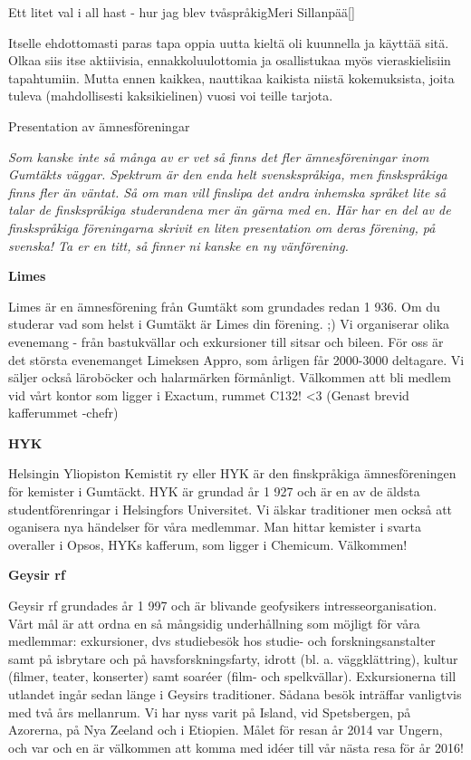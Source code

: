 \documentclass{spektraklet}
\begin{document}
\begin{artikel}{Ett litet val i all hast - hur jag blev tvåspråkig}{Meri Sillanpää}[]
\begin{twocolumns}
Itselle ehdottomasti paras tapa oppia uutta kieltä oli kuunnella ja käyttää sitä. Olkaa siis itse aktiivisia, ennakkoluulottomia ja osallistukaa myös vieraskielisiin tapahtumiin. Mutta ennen kaikkea, nauttikaa kaikista niistä kokemuksista, joita tuleva (mahdollisesti kaksikielinen) vuosi voi teille tarjota.

\end{twocolumns}
\end{artikel}

\newpage

\begin{artikel}{Presentation av ämnesföreningar}{}

\textit{Som kanske inte så många av er vet så finns det fler ämnesföreningar inom Gumtäkts
väggar. Spektrum är den enda helt svenskspråkiga, men finskspråkiga finns fler än väntat. Så
om man vill finslipa det andra inhemska språket lite så talar de finskspråkiga studerandena
mer än gärna med en. Här har en del av de finskspråkiga föreningarna skrivit en liten
presentation om deras förening, på svenska! Ta er en titt, så finner ni kanske en ny
vänförening.}

\textbf{Limes}

Limes är en ämnesförening från Gumtäkt som grundades redan 1 936.
Om du studerar vad som helst i Gumtäkt är Limes din förening. ;)
Vi organiserar olika evenemang - från bastukvällar och exkursioner till sitsar och bileen.
För oss är det största evenemanget Limeksen Appro, som årligen får 2000-3000 deltagare.
Vi säljer också läroböcker och halarmärken förmånligt.
Välkommen att bli medlem vid vårt kontor som ligger i Exactum, rummet C132! <3
(Genast brevid kafferummet -chefr)

\textbf{HYK}

Helsingin Yliopiston Kemistit ry eller HYK är den finskpråkiga ämnesföreningen för kemister i Gumtäckt.
HYK är grundad år 1 927 och är en av de äldsta studentförenringar i Helsingfors
Universitet.
Vi älskar traditioner men också att oganisera nya händelser för våra medlemmar.
Man hittar kemister i svarta overaller i Opsos, HYKs kafferum, som ligger i Chemicum.
Välkommen!

\textbf{Geysir rf}

Geysir rf grundades år 1 997 och är blivande geofysikers intresseorganisation. Vårt mål är att ordna en så mångsidig underhållning som möjligt för våra medlemmar: exkursioner,
dvs studiebesök hos studie- och forskningsanstalter samt på isbrytare och på havsforskningsfarty, idrott (bl. a. väggklättring), kultur (filmer, teater, konserter) samt soaréer (film- och spelkvällar). Exkursionerna till utlandet ingår sedan länge i Geysirs traditioner. Sådana besök inträffar vanligtvis med två års mellanrum. Vi har nyss varit på Island, vid Spetsbergen, på Azorerna, på Nya Zeeland och i Etiopien. Målet för resan år 2014 var Ungern, och var och en är välkommen att komma med idéer till vår nästa resa för år 2016!


\end{artikel}
\end{document}
